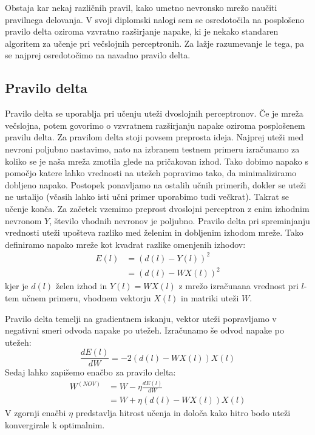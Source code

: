 \documentclass[mat1]{fmfdelo}
\begin{document}
Obstaja kar nekaj različnih pravil, kako umetno nevronsko mrežo naučiti pravilnega delovanja. V svoji diplomski nalogi sem se osredotočila na posplošeno pravilo delta oziroma vzvratno razširjanje napake, ki je nekako standaren algoritem za učenje pri večslojnih perceptronih. Za lažje razumevanje le tega, pa se najprej osredotočimo na navadno pravilo delta.

\subsection{Pravilo delta}
Pravilo delta se uporablja pri učenju uteži dvoslojnih perceptronov. Če je mreža večslojna, potem govorimo o vzvratnem razširjanju napake oziroma posplošenem pravilu delta. Za pravilom delta stoji povsem preprosta ideja. Najprej uteži med nevroni poljubno nastavimo, nato na izbranem testnem primeru izračunamo za koliko se je naša mreža zmotila glede na pričakovan izhod. Tako dobimo napako s pomočjo katere lahko vrednosti na utežeh popravimo tako, da minimaliziramo dobljeno napako. Postopek ponavljamo na ostalih učnih primerih, dokler se uteži ne ustalijo (včasih lahko isti učni primer uporabimo tudi večkrat). Takrat se učenje konča.
Za začetek vzemimo preprost dvoslojni perceptron z enim izhodnim nevronom $Y$, število vhodnih nevronov je poljubno. Pravilo delta pri spreminjanju vrednosti uteži upošteva razliko med želenim in dobljenim izhodom mreže. Tako definiramo napako mreže kot kvadrat razlike omenjenih izhodov:
%
\begin{equation}
\begin{aligned}
E(l) &= (d(l)-Y(l))^2 \\
&= (d(l)-WX(l))^2
\end{aligned}
\end{equation}
%
kjer je $d(l)$ želen izhod in $Y(l)= WX(l)$ z mrežo izračunana vrednost pri $l$-tem učnem primeru, vhodnem vektorju $X(l)$ in matriki uteži $W$.

Pravilo delta temelji na gradientnem iskanju, vektor uteži popravljamo v negativni smeri odvoda napake po utežeh. Izračunamo še odvod napake po utežeh:
%
\begin{equation*}
\frac{dE(l)}{dW}= -2(d(l)-WX(l))X(l)
\end{equation*}
%
Sedaj lahko zapišemo enačbo za pravilo delta:
%
\begin{equation}
\begin{aligned}
W^{(NOV)} &= W - \eta\frac{dE(l)}{dW} \\
&= W + \eta(d(l)-WX(l))X(l)
\label{utezi}
\end{aligned}
\end{equation}
%
V zgornji enačbi $\eta$ predstavlja hitrost učenja in določa kako hitro bodo uteži konvergirale k optimalnim. 
\end{document}
